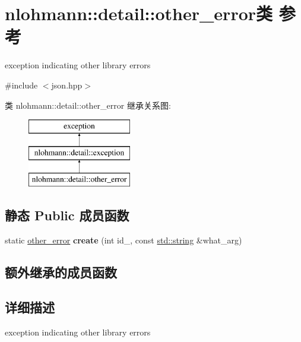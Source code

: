 \hypertarget{classnlohmann_1_1detail_1_1other__error}{}\section{nlohmann\+::detail\+::other\+\_\+error类 参考}
\label{classnlohmann_1_1detail_1_1other__error}


exception indicating other library errors  




{\ttfamily \#include $<$json.\+hpp$>$}

类 nlohmann\+::detail\+::other\+\_\+error 继承关系图\+:\begin{figure}[H]
\begin{center}
\leavevmode
\includegraphics[height=3.000000cm]{classnlohmann_1_1detail_1_1other__error}
\end{center}
\end{figure}
\subsection*{静态 Public 成员函数}
\begin{DoxyCompactItemize}
\item 
\mbox{\label{classnlohmann_1_1detail_1_1other__error_a87e8ab894e8c85c0d97a0919782d3683}} 
static \mbox{\hyperlink{classnlohmann_1_1detail_1_1other__error}{other\+\_\+error}} {\bfseries create} (int id\+\_\+, const \mbox{\hyperlink{namespacenlohmann_1_1detail_a1ed8fc6239da25abcaf681d30ace4985ab45cffe084dd3d20d928bee85e7b0f21}{std\+::string}} \&what\+\_\+arg)
\end{DoxyCompactItemize}
\subsection*{额外继承的成员函数}


\subsection{详细描述}
exception indicating other library errors 

